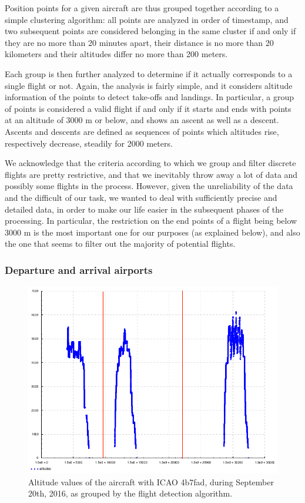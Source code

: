 \documentclass{vldb}
\begin{document}
Position points for a given aircraft are thus grouped together according to a
simple clustering algorithm: all points are analyzed in order of timestamp, and
two subsequent points are considered belonging in the same cluster if and only
if they are no more than 20 minutes apart, their distance is no more than 20
kilometers and their altitudes differ no more than 200 meters.

Each group is then further analyzed to determine if it actually corresponds to a
single flight or not. Again, the analysis is fairly simple, and it considers
altitude information of the points to detect take-offs and landings. In
particular, a group of points is considered a valid flight if and only if it
starts and ends with points at an altitude of 3000 m or below, and shows an
ascent as well as a descent. Ascents and descents are defined as sequences of
points which altitudes rise, respectively decrease, steadily for 2000 meters.

We acknowledge that the criteria according to which we group and filter discrete
flights are pretty restrictive, and that we inevitably throw away a lot of data
and possibly some flights in the process. However, given the unreliability of
the data and the difficult of our task, we wanted to deal with sufficiently
precise and detailed data, in order to make our life easier in the subsequent
phases of the processing. In particular, the restriction on the end points of a
flight being below 3000 m is the most important one for our purposes (as
explained below), and also the one that seems to filter out the majority of
potential flights.

\subsubsection{Departure and arrival airports}

\begin{figure}[t]
  \centering
  \includegraphics[scale=0.28]{imgs/4b7fad-altitudes-grouped.png}
  \caption{Altitude values of the aircraft with ICAO 4b7fad, during September
    20th, 2016, as grouped by the flight detection algorithm.}
  \label{fig:alts}
\end{figure}
\end{document}
